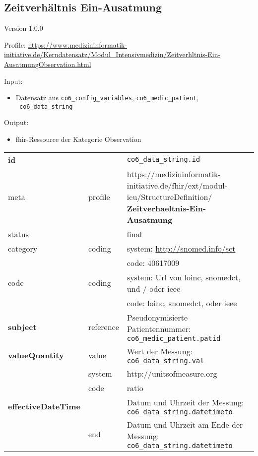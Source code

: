\subsection{Zeitverhältnis Ein-Ausatmung} 
\noindent Version 1.0.0

\noindent Profile: \url{https://www.medizininformatik-initiative.de/Kerndatensatz/Modul_Intensivmedizin/Zeitverhltnis-Ein-AusatmungObservation.html}

\noindent Input:
\begin{itemize}
	\item Datensatz aus \texttt{co6\_config\_variables}, \texttt{co6\_medic\_patient}, \\ \texttt{
co6\_data\_string}
\end{itemize}
Output:
\begin{itemize}
        \item \ac{fhir}-Ressource der Kategorie \glqq Observation\grqq{}
\end{itemize}
\begin{longtable}{|l|l|p{7.5cm}|}
        \hline
        \rowcolor{lightgray} \multicolumn{3}{|l|}{Data Mapping (inhaltlich)} \\ \hline
        \textbf{id} &  & \texttt{co6\_data\_string.id} \\ \hline
	meta & profile & https://medizininformatik-initiative.de/fhir/ext/modul-icu/StructureDefinition/\textbf{
Zeitverhaeltnis-Ein-Ausatmung} \\ \hline 
	status &  & final   \\ \hline 
	category & coding & system: \url{http://snomed.info/sct} \\
\cline{3-3}
	& & code: 40617009 \\ \hline
	code & coding & system: Url von \ac{loinc}, \ac{snomedct}, und / oder \ac{ieee} \\ 
	\cline{3-3} 
	 &  & code: \ac{loinc}, \ac{snomedct}, oder \ac{ieee} \\ \hline
	 \textbf{subject}  & reference & Pseudonymisierte Patientennummer: \texttt{co6\_medic\_patient.patid} \\ \hline
	 \textbf{valueQuantity}  & value & Wert der Messung: \texttt{
co6\_data\_string.val} \\
        \cline{2-3}
         & system & http://unitsofmeasure.org \\
         \cline{2-3}
         & code & {ratio} \\ \hline
     \textbf{effectiveDateTime}  & & Datum und Uhrzeit der Messung: \texttt{
co6\_data\_string.datetimeto} \\
    \cline{2-3}
     & end & Datum und Uhrzeit am Ende der Messung: \texttt{
co6\_data\_string.datetimeto} \\ \hline
\end{longtable}
\clearpage

